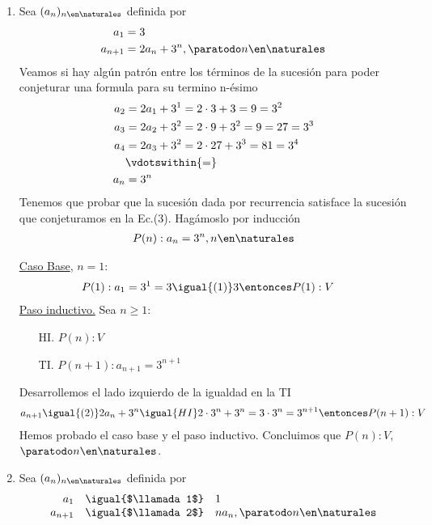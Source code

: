 \begin{enumerate}[label=\roman*)]
  \item Sea $(a_n)_{n \en \naturales }$ definida por
        \setcounter{equation}{0}
        \begin{align}
          a_1     & = 3                                       \\
          a_{n+1} & = 2 a_n + 3^n, \paratodo n \en \naturales
        \end{align}
        Veamos si hay algún patrón entre los términos de la sucesión para poder conjeturar una formula para su termino
        n-ésimo
        \begin{align*}
          a_2 & = 2 a_1 + 3^1 = 2 \cdot 3 + 3 = 9 = 3^2         \\
          a_3 & = 2 a_2 + 3^2 = 2 \cdot 9 + 3^2 = 9  = 27 = 3^3 \\
          a_4 & = 2 a_3 + 3^2 = 2 \cdot 27 + 3^3  = 81 = 3^4    \\
              & \vdotswithin{=}                                 \\
          a_n & = 3^n
        \end{align*}
        Tenemos que probar que la sucesión dada por recurrencia satisface la sucesión que conjeturamos en la Ec.(3).
        Hagámoslo por inducción
        \begin{align*}
          P(n): a_n = 3^n,  n \en \naturales
        \end{align*}

        \underline{Caso Base}, $n = 1$:
        \begin{align*}
           & P(1): a_1 = 3^1 = 3 \igual{(1)} 3 \entonces P(1):V
        \end{align*}
        \underline{Paso inductivo.} Sea $n \geq 1$:
        \begin{enumerate}
          \item[HI.] $P(n): V$
          \item[TI.] $P(n+1): a_{n+1} = 3^{n+1}$
        \end{enumerate}
        Desarrollemos el lado izquierdo de la igualdad en la TI
        \begin{align*}
          a_{n+1} \igual{(2)} 2 a_n + 3^n \igual{HI} 2 \cdot 3^n + 3^n = 3 \cdot 3^n = 3^{n+1}
          \entonces P(n+1):V
        \end{align*}
        Hemos probado el caso base y el paso inductivo. Concluimos que $P(n):V,$ $\paratodo n \en \naturales $.

  \item Sea $(a_n)_{n \en \naturales }$ definida por
        $$
          \begin{array}{rcl}
            a_1     & \igual{$\llamada1$} & 1                                 \\
            a_{n+1} & \igual{$\llamada2$} & n a_n, \paratodo n \en \naturales
          \end{array}
        $$


\end{enumerate}
